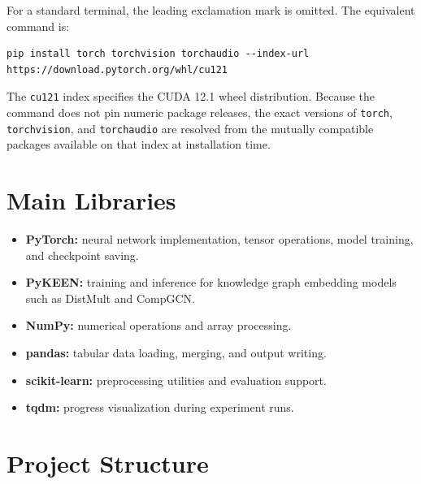 For a standard terminal, the leading exclamation mark is omitted. The
equivalent command is:

\begin{lstlisting}[caption={Terminal installation command for PyTorch CUDA 12.1}]
pip install torch torchvision torchaudio --index-url https://download.pytorch.org/whl/cu121
\end{lstlisting}

The \texttt{cu121} index specifies the CUDA 12.1 wheel distribution. Because
the command does not pin numeric package releases, the exact versions of
\texttt{torch}, \texttt{torchvision}, and \texttt{torchaudio} are resolved
from the mutually compatible packages available on that index at installation
time.

\section{Main Libraries}

\begin{itemize}
    \item \textbf{PyTorch:} neural network implementation, tensor operations,
    model training, and checkpoint saving.

    \item \textbf{PyKEEN:} training and inference for knowledge graph embedding
    models such as DistMult and CompGCN.

    \item \textbf{NumPy:} numerical operations and array processing.

    \item \textbf{pandas:} tabular data loading, merging, and output writing.

    \item \textbf{scikit-learn:} preprocessing utilities and evaluation support.

    \item \textbf{tqdm:} progress visualization during experiment runs.
\end{itemize}

\section{Project Structure}

